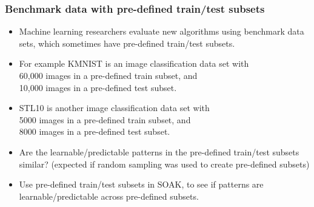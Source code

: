 \documentclass[t,aspectratio=1610]{beamer}
\begin{document}
\begin{frame}
  \frametitle{Benchmark data with pre-defined train/test subsets}
  \begin{itemize}
  \item Machine learning researchers evaluate new algorithms using
    benchmark data sets, which sometimes have pre-defined train/test
    subsets.
  \item For example KMNIST is an image classification data set with \\
    60,000 images in a pre-defined train subset, and \\
    10,000 images in a pre-defined test subset.
  \item STL10 is another image classification data set with \\
    5000 images in a pre-defined train subset, and \\
    8000 images in a pre-defined test subset.
  \item Are the learnable/predictable patterns in the pre-defined train/test subsets
    similar? (expected if random sampling was used to create pre-defined subsets)
  \item Use pre-defined train/test subsets in SOAK, to see if patterns are learnable/predictable across pre-defined subsets.
  \end{itemize}
\end{frame}
\end{document}
